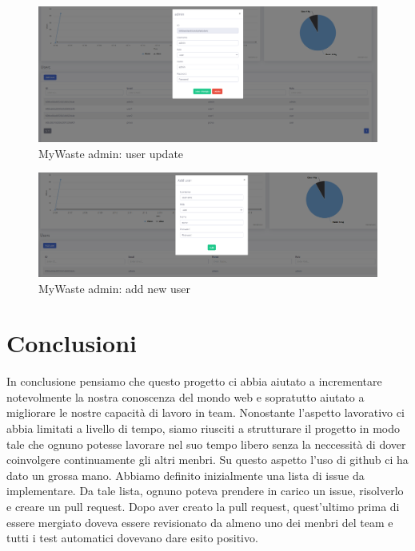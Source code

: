 \documentclass{report}
\begin{document}
\begin{figure}[h!]
    \begin{center}
        \includegraphics[width=1.0\textwidth]{images/updateUserData.PNG}  \end{center}
    \caption{MyWaste admin: user update}
    \label{fig: userUpdate}
\end{figure}
\begin{figure}[h!]
    \begin{center}
        \includegraphics[width=1.0\textwidth]{images/addNewUser.PNG}  \end{center}
    \caption{MyWaste admin: add new user}
    \label{fig: addNewUser}
\end{figure}

\section{Conclusioni}
In conclusione pensiamo che questo progetto ci abbia aiutato a incrementare notevolmente la nostra conoscenza del mondo web
e sopratutto aiutato a migliorare le nostre capacità di lavoro in team.
Nonostante l'aspetto lavorativo ci abbia limitati a livello di tempo, siamo riusciti a strutturare il progetto in modo tale
che ognuno potesse lavorare nel suo tempo libero senza la neccessità di dover coinvolgere continuamente gli altri menbri.
Su questo aspetto l'uso di github ci ha dato un grossa mano. Abbiamo definito inizialmente una lista di issue da implementare.
Da tale lista, ognuno poteva prendere in carico un issue, risolverlo e creare un pull request. Dopo aver creato la pull request,
quest'ultimo prima di essere mergiato doveva essere revisionato da almeno uno dei menbri del team e tutti i test automatici
dovevano dare esito positivo.


%
%
\end{document}
